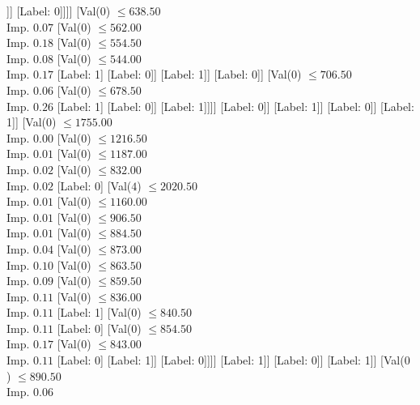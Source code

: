 \documentclass[margin=10pt]{standalone}
\begin{document}
\begin{forest}
												[Label: 1]
												[Val($0$) $ \leq 704.00$ \\ Imp. $0.44$
													[Label: 0]
													[Label: 1]]]
											[Label: 0]]]]
								[Val($0$) $ \leq 638.50$ \\ Imp. $0.07$
									[Val($0$) $ \leq 562.00$ \\ Imp. $0.18$
										[Val($0$) $ \leq 554.50$ \\ Imp. $0.08$
											[Val($0$) $ \leq 544.00$ \\ Imp. $0.17$
												[Label: 1]
												[Label: 0]]
											[Label: 1]]
										[Label: 0]]
									[Val($0$) $ \leq 706.50$ \\ Imp. $0.06$
										[Val($0$) $ \leq 678.50$ \\ Imp. $0.26$
											[Label: 1]
											[Label: 0]]
										[Label: 1]]]]
							[Label: 0]]
						[Label: 1]]
					[Label: 0]]
				[Label: 1]]
			[Val($0$) $ \leq 1755.00$ \\ Imp. $0.00$
				[Val($0$) $ \leq 1216.50$ \\ Imp. $0.01$
					[Val($0$) $ \leq 1187.00$ \\ Imp. $0.02$
						[Val($0$) $ \leq 832.00$ \\ Imp. $0.02$
							[Label: 0]
							[Val($4$) $ \leq 2020.50$ \\ Imp. $0.01$
								[Val($0$) $ \leq 1160.00$ \\ Imp. $0.01$
									[Val($0$) $ \leq 906.50$ \\ Imp. $0.01$
										[Val($0$) $ \leq 884.50$ \\ Imp. $0.04$
											[Val($0$) $ \leq 873.00$ \\ Imp. $0.10$
												[Val($0$) $ \leq 863.50$ \\ Imp. $0.09$
													[Val($0$) $ \leq 859.50$ \\ Imp. $0.11$
														[Val($0$) $ \leq 836.00$ \\ Imp. $0.11$
															[Label: 1]
															[Val($0$) $ \leq 840.50$ \\ Imp. $0.11$
																[Label: 0]
																[Val($0$) $ \leq 854.50$ \\ Imp. $0.17$
																	[Val($0$) $ \leq 843.00$ \\ Imp. $0.11$
																		[Label: 0]
																		[Label: 1]]
																	[Label: 0]]]]
														[Label: 1]]
													[Label: 0]]
												[Label: 1]]
											[Val($0$) $ \leq 890.50$ \\ Imp. $0.06$

\end{forest}
\end{document}

